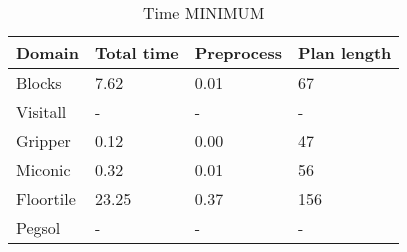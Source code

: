 \documentclass[]{article}
\begin{document}
\begin{table}
	\caption{Time MINIMUM}
	\label{tab:time_minimum}
	\begin{center}
		\begin{tabular}{l|l|l|l|}			 
			Domain & Total time & Preprocess & Plan length  \\
			\hline
			Blocks & 7.62 & 0.01 & 67  \\
			Visitall & - & - & -  \\
			Gripper & 0.12 & 0.00 & 47  \\
			Miconic & 0.32 & 0.01 & 56  \\
			Floortile & 23.25 & 0.37 & 156 \\
			Pegsol & - & - & - \\
		\end{tabular}
	\end{center}	
\end{table}
\end{document}

